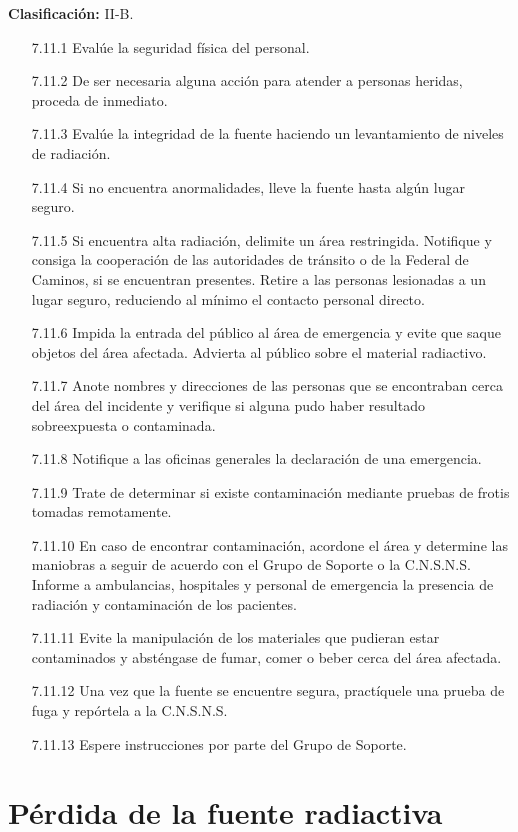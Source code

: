 \textbf{Clasificación:} II-B.
\begin{enumerate}
  \item[7.11.1] Evalúe la seguridad física del personal.
  \item[7.11.2] De ser necesaria alguna acción para atender a personas heridas, proceda de inmediato.
  \item[7.11.3] Evalúe la integridad de la fuente haciendo un levantamiento de niveles de radiación.
  \item[7.11.4] Si no encuentra anormalidades, lleve la fuente hasta algún lugar seguro.
  \item[7.11.5] Si encuentra alta radiación, delimite un área restringida. Notifique y consiga la cooperación de las autoridades de tránsito o de la Federal de Caminos, si se encuentran presentes. Retire a las personas lesionadas a un lugar seguro, reduciendo al mínimo el contacto personal directo.
  \item[7.11.6] Impida la entrada del público al área de emergencia y evite que saque objetos del área afectada. Advierta al público sobre el material radiactivo.
  \item[7.11.7] Anote nombres y direcciones de las personas que se encontraban cerca del área del incidente y verifique si alguna pudo haber resultado sobreexpuesta o contaminada.
  \item[7.11.8] Notifique a las oficinas generales la declaración de una emergencia.
  \item[7.11.9] Trate de determinar si existe contaminación mediante pruebas de frotis tomadas remotamente.
  \item[7.11.10] En caso de encontrar contaminación, acordone el área y determine las maniobras a seguir de acuerdo con el Grupo de Soporte o la C.N.S.N.S. Informe a ambulancias, hospitales y personal de emergencia la presencia de radiación y contaminación de los pacientes.
  \item[7.11.11] Evite la manipulación de los materiales que pudieran estar contaminados y absténgase de fumar, comer o beber cerca del área afectada.
  \item[7.11.12] Una vez que la fuente se encuentre segura, practíquele una prueba de fuga y repórtela a la C.N.S.N.S.
  \item[7.11.13] Espere instrucciones por parte del Grupo de Soporte.
\end{enumerate}

\section{Pérdida de la fuente radiactiva}

